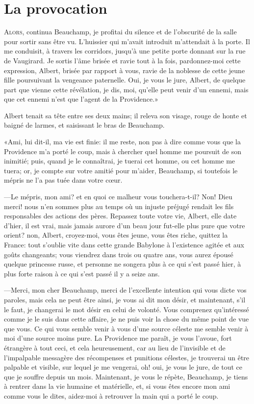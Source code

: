 \chapter{La provocation}

\lettrine[ante=«]{A}{lors,} continua Beauchamp, je profitai du silence et de l'obscurité de la salle pour sortir sans être vu. L'huissier qui m'avait introduit m'attendait à la porte. Il me conduisit, à travers les corridors, jusqu'à une petite porte donnant sur la rue de Vaugirard. Je sortis l'âme brisée et ravie tout à la fois, pardonnez-moi cette expression, Albert, brisée par rapport à vous, ravie de la noblesse de cette jeune fille poursuivant la vengeance paternelle. Oui, je vous le jure, Albert, de quelque part que vienne cette révélation, je dis, moi, qu'elle peut venir d'un ennemi, mais que cet ennemi n'est que l'agent de la Providence.» 

Albert tenait sa tête entre ses deux mains; il releva son visage, rouge de honte et baigné de larmes, et saisissant le bras de Beauchamp. 

«Ami, lui dit-il, ma vie est finie: il me reste, non pas à dire comme vous que la Providence m'a porté le coup, mais à chercher quel homme me poursuit de son inimitié; puis, quand je le connaîtrai, je tuerai cet homme, ou cet homme me tuera; or, je compte sur votre amitié pour m'aider, Beauchamp, si toutefois le mépris ne l'a pas tuée dans votre cœur. 

—Le mépris, mon ami? et en quoi ce malheur vous touchera-t-il? Non! Dieu merci! nous n'en sommes plus au temps où un injuste préjugé rendait les fils responsables des actions des pères. Repassez toute votre vie, Albert, elle date d'hier, il est vrai, mais jamais aurore d'un beau jour fut-elle plus pure que votre orient? non, Albert, croyez-moi, vous êtes jeune, vous êtes riche, quittez la France: tout s'oublie vite dans cette grande Babylone à l'existence agitée et aux goûts changeants; vous viendrez dans trois ou quatre ans, vous aurez épousé quelque princesse russe, et personne ne songera plus à ce qui s'est passé hier, à plus forte raison à ce qui s'est passé il y a seize ans. 

—Merci, mon cher Beauchamp, merci de l'excellente intention qui vous dicte vos paroles, mais cela ne peut être ainsi, je vous ai dit mon désir, et maintenant, s'il le faut, je changerai le mot désir en celui de volonté. Vous comprenez qu'intéressé comme je le suis dans cette affaire, je ne puis voir la chose du même point de vue que vous. Ce qui vous semble venir à vous d'une source céleste me semble venir à moi d'une source moins pure. La Providence me paraît, je vous l'avoue, fort étrangère à tout ceci, et cela heureusement, car au lieu de l'invisible et de l'impalpable messagère des récompenses et punitions célestes, je trouverai un être palpable et visible, sur lequel je me vengerai, oh! oui, je vous le jure, de tout ce que je souffre depuis un mois. Maintenant, je vous le répète, Beauchamp, je tiens à rentrer dans la vie humaine et matérielle, et, si vous êtes encore mon ami comme vous le dites, aidez-moi à retrouver la main qui a porté le coup. 

